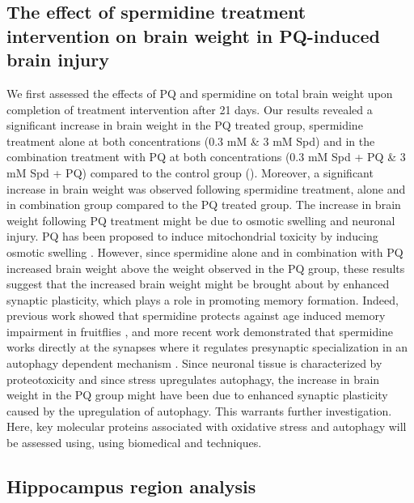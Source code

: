 \subsection{The effect of spermidine treatment intervention on brain weight in PQ-induced brain injury}
We first assessed the effects of PQ and spermidine on total brain weight upon completion of treatment intervention after 21 days. Our results revealed a significant increase in brain weight in the PQ treated group, spermidine treatment alone at both concentrations (0.3 mM \& 3 mM Spd) and in the combination treatment with PQ at both concentrations (0.3 mM Spd + PQ \& 3 mM Spd + PQ) compared to the control group (). Moreover, a significant increase in brain weight was observed following spermidine treatment, alone and in combination group compared to the PQ treated group. The increase in brain weight following PQ treatment might be due to osmotic swelling and neuronal injury. PQ has been proposed to induce mitochondrial toxicity by inducing osmotic swelling \citep{Cappelletti1996,Mohammadi-Bardbori2008}. However, since spermidine alone and in combination with PQ increased brain weight above the weight observed in the PQ group, these results suggest that the increased brain weight might be brought about by enhanced synaptic plasticity, which plays a role in promoting memory formation. Indeed, previous work showed that spermidine protects against age induced memory impairment in fruitflies \citep{Gupta2016,Gupta2013,Sigrist2014}, and more recent work demonstrated that spermidine works directly at the synapses where it regulates presynaptic specialization in an autophagy dependent mechanism \citep{Bhukel2017}. Since neuronal tissue is characterized by proteotoxicity and since stress upregulates autophagy, the increase in brain weight in the PQ group might have been due to enhanced synaptic plasticity caused by the upregulation of autophagy. This warrants further investigation. Here, key molecular proteins associated with oxidative stress and autophagy will be assessed using, using biomedical and techniques.

\subsection{Hippocampus region analysis} 
